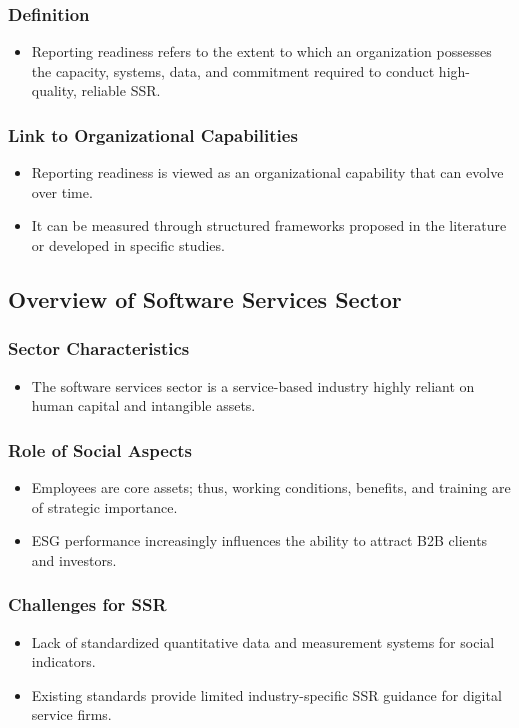 \subsubsection{Definition}
\begin{itemize}
    \item Reporting readiness refers to the extent to which an organization possesses the capacity, systems, data, 
    and commitment required to conduct high-quality, reliable SSR. 
\end{itemize}

\subsubsection{Link to Organizational Capabilities}
\begin{itemize}
    \item Reporting readiness is viewed as an organizational capability that can evolve over time.
    \item It can be measured through structured frameworks proposed in the literature or developed in specific studies.
\end{itemize}

\subsection{Overview of Software Services Sector}
\subsubsection{Sector Characteristics}
\begin{itemize}
    \item The software services sector is 
    a service-based industry highly reliant on human capital and intangible assets. 
\end{itemize}

\subsubsection{Role of Social Aspects}
\begin{itemize}
    \item Employees are core assets; thus, working conditions, benefits, and training are of strategic importance. 
    \item ESG performance increasingly influences the ability to attract B2B clients and investors.
\end{itemize}

\subsubsection{Challenges for SSR}
\begin{itemize}
    \item Lack of standardized quantitative data and measurement systems for social indicators.
    \item Existing standards provide limited industry-specific SSR guidance for digital service firms.
\end{itemize}

